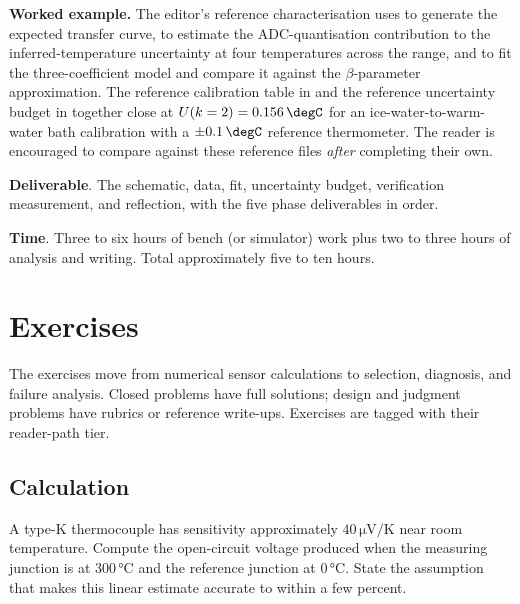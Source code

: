 \begin{project}
\textbf{Worked example.} The editor's reference characterisation
uses  to generate the
expected transfer curve,
 to estimate the
ADC-quantisation contribution to the inferred-temperature
uncertainty at four temperatures across the range, and
 to fit the
three-coefficient model and compare it against the
$\beta$-parameter approximation. The reference calibration table
in  and the
reference uncertainty budget in
 together close at
$U(k = 2) = 0.156 \,\degC$ for an ice-water-to-warm-water bath
calibration with a $\pm 0.1 \,\degC$ reference thermometer. The
reader is encouraged to compare against these reference files
\emph{after} completing their own.

\textbf{Deliverable}. The schematic, data, fit, uncertainty
budget, verification measurement, and reflection, with the five
phase deliverables in order.

\textbf{Time}. Three to six hours of bench (or simulator) work
plus two to three hours of analysis and writing. Total
approximately five to ten hours.
\end{project}

\section{Exercises}

The exercises move from numerical sensor calculations to selection,
diagnosis, and failure analysis. Closed problems have full
solutions; design and judgment problems have rubrics or reference
write-ups. Exercises are tagged with their reader-path tier.

\subsection*{Calculation}

\begin{exercise}
A type-K thermocouple has sensitivity approximately $40 \,\si{\micro
\volt\per\kelvin}$ near room temperature. Compute the open-circuit
voltage produced when the measuring junction is at
$300 \,\si{\degreeCelsius}$ and the reference junction at
$0 \,\si{\degreeCelsius}$. State the assumption that makes this
linear estimate accurate to within a few percent.
\end{exercise}

